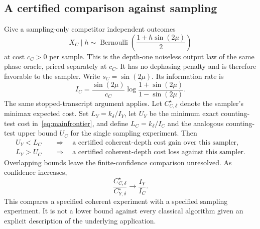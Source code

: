 \documentclass[11pt,a4paper]{article}
\theoremstyle{definition}
\theoremstyle{remark}
\numberwithin{equation}{section}
\begin{document}
\subsection{A certified comparison against sampling}\label{sec:comparison-sampling}
Give a sampling-only competitor independent outcomes
\begin{equation}
 X_C\mid h\sim\operatorname{Bernoulli}\left(\frac{1+h\sin(2\mu)}2\right)
\end{equation}
at cost $c_C>0$ per sample. This is the depth-one noiseless output law of the same phase oracle,
priced separately at $c_C$. It has no dephasing penalty and is
therefore favorable to the sampler. Write $s_C=\sin(2\mu)$. Its information rate is
\begin{equation}
 I_C=\frac{\sin(2\mu)}{c_C}
 \log\frac{1+\sin(2\mu)}{1-\sin(2\mu)}.
\end{equation}
The same stopped-transcript argument applies. Let $C_{C,\delta}^\star$ denote
the sampler's minimax expected cost. Set $L_Y=k_\delta/I_Y$, let $U_Y$
be the minimum exact counting-test cost in~\eqref{eq:mainfrontier}, and
define $L_C=k_\delta/I_C$ and the analogous counting-test upper bound $U_C$
for the single sampling experiment. Then
\begin{align}
 U_Y<L_C&\quad\Longrightarrow\quad
 \text{a certified coherent-depth cost gain over this sampler},\\
 L_Y>U_C&\quad\Longrightarrow\quad
 \text{a certified coherent-depth cost loss against this sampler}.
\end{align}
Overlapping bounds leave the finite-confidence comparison unresolved.
As confidence increases,
\begin{equation}\label{eq:asymptoticratio}
 \frac{C_{C,\delta}^\star}{C_{Y,\delta}^\star}
 \longrightarrow\frac{I_Y}{I_C}.
\end{equation}
This compares a specified coherent experiment with a specified sampling
experiment. It is not a lower bound against every classical algorithm
given an explicit description of the underlying application.
\end{document}
